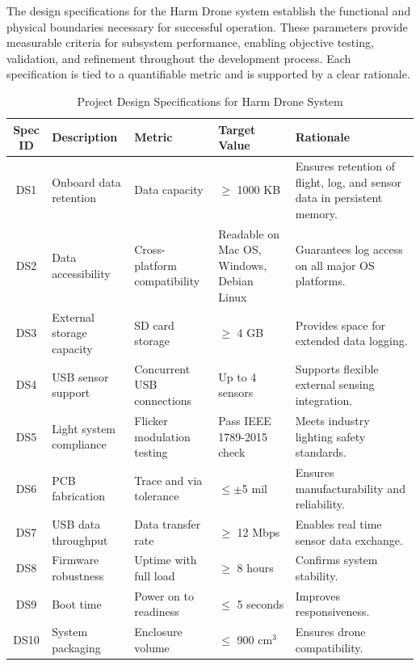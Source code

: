\documentclass[12pt]{article}
\begin{document}
\par The design specifications for the Harm Drone system establish the functional and physical boundaries necessary for successful operation. These parameters provide measurable criteria for subsystem performance, enabling objective testing, validation, and refinement throughout the development process. Each specification is tied to a quantifiable metric and is supported by a clear rationale.

\begin{table}[H]
\centering
\begin{tabular}{|c|p{3cm}|p{3cm}|p{3cm}|p{4cm}|}
\hline
\textbf{Spec ID} & \textbf{Description} & \textbf{Metric} & \textbf{Target Value} & \textbf{Rationale} \\
\hline
DS1 & Onboard data retention & Data capacity & $\geq$ 1000 KB & Ensures retention of flight, log, and sensor data in persistent memory. \\
\hline
DS2 & Data accessibility & Cross-platform compatibility & Readable on Mac OS, Windows, Debian Linux & Guarantees log access on all major OS platforms. \\
\hline
DS3 & External storage capacity & SD card storage & $\geq$ 4 GB & Provides space for extended data logging. \\
\hline
DS4 & USB sensor support & Concurrent USB connections & Up to 4 sensors & Supports flexible external sensing integration. \\
\hline
DS5 & Light system compliance & Flicker modulation testing & Pass IEEE 1789-2015 check & Meets industry lighting safety standards. \\
\hline
DS6 & PCB fabrication & Trace and via tolerance & $\leq \pm$5 mil & Ensures manufacturability and reliability. \\
\hline
DS7 & USB data throughput & Data transfer rate & $\geq$ 12 Mbps & Enables real time sensor data exchange. \\
\hline
DS8 & Firmware robustness & Uptime with full load & $\geq$ 8 hours & Confirms system stability. \\
\hline
DS9 & Boot time & Power on to readiness & $\leq$ 5 seconds & Improves responsiveness. \\
\hline
DS10 & System packaging & Enclosure volume & $\leq$ 900 cm$^3$ & Ensures drone compatibility. \\
\hline
\end{tabular}
\caption{Project Design Specifications for Harm Drone System}
\end{table}
\end{document}
